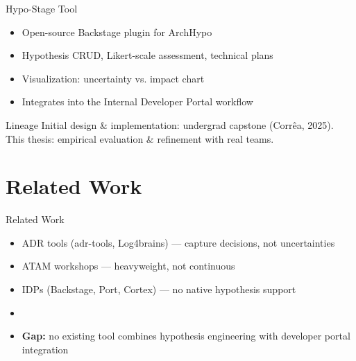 \documentclass[
  xcolor={hyperref,svgnames,x11names,table},
  hyperref={pdfencoding=unicode,plainpages=false,pdfpagelabels=true,breaklinks=true},
  brazilian,english,12pt,aspectratio=149,
]{beamer}
\begin{document}
\begin{frame}{Hypo-Stage Tool}
  \begin{itemize}
    \item Open-source Backstage plugin for ArchHypo
    \item Hypothesis CRUD, Likert-scale assessment, technical plans
    \item Visualization: uncertainty vs. impact chart
    \item Integrates into the Internal Developer Portal workflow
  \end{itemize}

  \vspace{0.5\baselineskip}

  \begin{block}{Lineage}
    Initial design \& implementation: undergrad capstone (Corrêa, 2025).\\
    This thesis: empirical evaluation \& refinement with real teams.
  \end{block}

\end{frame}


\section{Related Work}

\begin{frame}{Related Work}
  \begin{itemize}
    \item ADR tools (adr-tools, Log4brains) --- capture decisions, not uncertainties
    \item ATAM workshops --- heavyweight, not continuous
    \item IDPs (Backstage, Port, Cortex) --- no native hypothesis support
    \item[]
    \item \textbf{Gap:} no existing tool combines hypothesis engineering with
          developer portal integration
  \end{itemize}
\end{frame}


\end{document}
